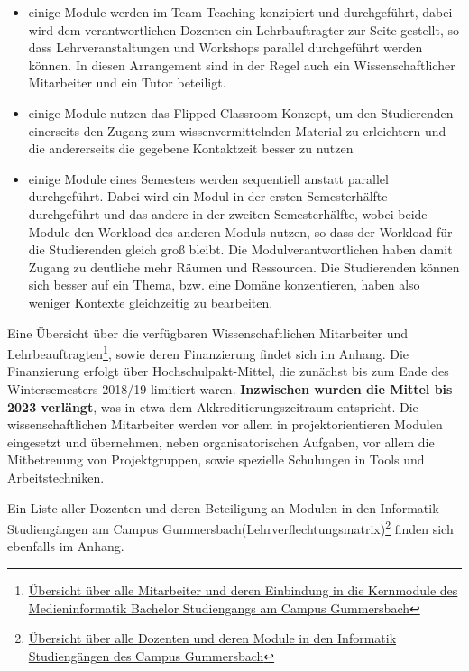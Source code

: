 \begin{itemize}
\tightlist
\item
  einige Module werden im Team-Teaching konzipiert und durchgeführt,
  dabei wird dem verantwortlichen Dozenten ein Lehrbauftragter zur Seite
  gestellt, so dass Lehrveranstaltungen und Workshops parallel
  durchgeführt werden können. In diesen Arrangement sind in der Regel
  auch ein Wissenschaftlicher Mitarbeiter und ein Tutor beteiligt.
\item
  einige Module nutzen das Flipped Classroom Konzept, um den
  Studierenden einerseits den Zugang zum wissenvermittelnden Material zu
  erleichtern und die andererseits die gegebene Kontaktzeit besser zu
  nutzen
\item
  einige Module eines Semesters werden sequentiell anstatt parallel
  durchgeführt. Dabei wird ein Modul in der ersten Semesterhälfte
  durchgeführt und das andere in der zweiten Semesterhälfte, wobei beide
  Module den Workload des anderen Moduls nutzen, so dass der Workload
  für die Studierenden gleich groß bleibt. Die Modulverantwortlichen
  haben damit Zugang zu deutliche mehr Räumen und Ressourcen. Die
  Studierenden können sich besser auf ein Thema, bzw. eine Domäne
  konzentieren, haben also weniger Kontexte gleichzeitig zu bearbeiten.
\end{itemize}

Eine Übersicht über die verfügbaren Wissenschaftlichen Mitarbeiter und
Lehrbeauftragten\footnote{\href{https://th-koeln.github.io/mi-2017/anhaenge/stellungsnahme/mitarbeiter-und-module-mi-kern-2017.pdf}{Übersicht
  über alle Mitarbeiter und deren Einbindung in die Kernmodule des
  Medieninformatik Bachelor Studiengangs am Campus Gummersbach}}, sowie
deren Finanzierung findet sich im Anhang. Die Finanzierung erfolgt über
Hochschulpakt-Mittel, die zunächst bis zum Ende des Wintersemesters
2018/19 limitiert waren. \textbf{Inzwischen wurden die Mittel bis 2023
verlängt}, was in etwa dem Akkreditierungszeitraum entspricht. Die
wissenschaftlichen Mitarbeiter werden vor allem in projektorientieren
Modulen eingesetzt und übernehmen, neben organisatorischen Aufgaben, vor
allem die Mitbetreuung von Projektgruppen, sowie spezielle Schulungen in
Tools und Arbeitstechniken.

Ein Liste aller Dozenten und deren Beteiligung an Modulen in den
Informatik Studiengängen am Campus
Gummersbach(Lehrverflechtungsmatrix)\footnote{\href{https://th-koeln.github.io/mi-2017/anhaenge/stellungsnahme/dozenten-und-module-2017.pdf}{Übersicht
  über alle Dozenten und deren Module in den Informatik Studiengängen
  des Campus Gummersbach}} finden sich ebenfalls im Anhang.

